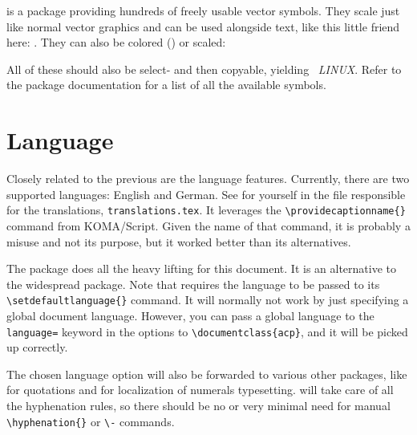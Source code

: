  is a package providing hundreds of freely usable vector
symbols.
They scale just like normal vector graphics and can be used alongside text, like
this little friend here: .
They can also be colored (\textcolor{mRed}{}) or scaled:
\begin{center}
\end{center}
All of these should also be select- and then copyable, yielding \
\emph{LINUX}.
Refer to the package documentation for a list of all the available symbols.

\section{Language}

Closely related to the previous  are the language features.
Currently, there are two supported languages: English and German.
See for yourself in the file responsible for the translations, \verb|translations.tex|.
It leverages the \verb|\providecaptionname{}| command from KOMA\-/Script.
Given the name of that command, it is probably a misuse and not its purpose, but
it worked better than its alternatives.

The  package does all the heavy lifting for this document.
It is an alternative to the widespread \ctanpackage{babel} package.
Note that \ctanpackage{polyglossia} requires the language to be passed to its
\verb|\setdefaultlanguage{}| command.
It will normally not work by just specifying a global document language.
However, you can pass a global language to the \verb|language=| keyword in the
options to \verb|\documentclass{acp}|, and it will be picked up correctly.

The chosen language option will also be forwarded to various other packages, like
\ctanpackage{enquote} for quotations and \ctanpackage{siunitx} for localization of
numerals typesetting.
 will take care of all the hyphenation rules, so there
should be no or very minimal need for manual \verb|\hyphenation{}| or \verb|\-|
commands.

